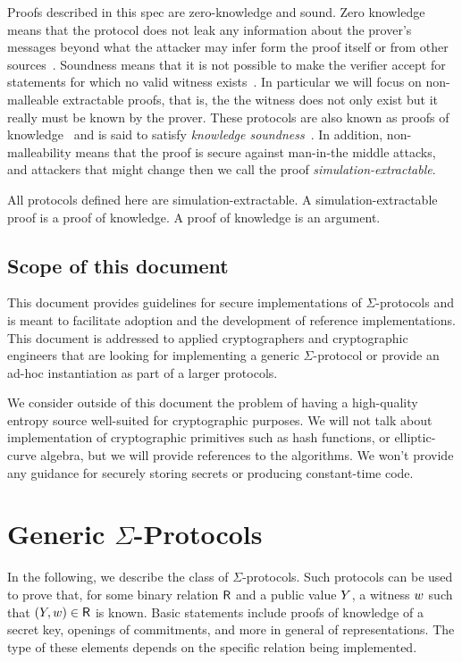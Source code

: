\documentclass[11pt]{article}
\begin{document}
Proofs described in this spec are zero-knowledge and sound.
Zero knowledge means that the protocol does not leak any information about the prover's messages beyond what the attacker may infer form the proof itself or from other sources~\cite[1.6.4]{zkproof-reference}.
Soundness means that it is not possible to make the verifier accept for statements for which no valid witness exists~\cite[1.6.2]{zkproof-reference}.
In particular we will focus on non-malleable extractable proofs, that is, the the witness does not only exist but it really must be known by the prover.
These protocols are also known as proofs of knowledge~\cite{STOC:GolMicRac85,STOC:FeiFiaSha87,C:BelGol92} and is said to satisfy \emph{knowledge soundness}~\cite{damgard04}. In addition, non-malleability means that the proof is secure against man-in-the middle attacks, and attackers that might change  then we call the proof \emph{simulation-extractable}.

All protocols defined here are simulation-extractable. A simulation-extractable proof is a proof of knowledge. A proof of knowledge is an argument.

\subsection{Scope of this document}

This document provides guidelines for secure implementations of $\Sigma$-protocols and is meant to facilitate adoption and the development of reference implementations.
This document is addressed to applied cryptographers and cryptographic engineers that are looking for implementing a generic
$\Sigma$-protocol or provide an ad-hoc instantiation as part of a larger protocols.

We consider outside of this document the problem of having a high-quality
entropy source well-suited for crypto\-graphic purposes.
We will not talk about implementation of cryptographic primitives such as hash functions, or elliptic-curve algebra, but we will provide references to the algorithms.
We won't provide any guidance for securely storing secrets or producing constant-time code.

\section{Generic $\Sigma$-Protocols}
In the following, we describe the class of $\Sigma$-protocols.
Such protocols can be used to prove that, for some binary relation $\mathsf{R}$ and a public value $Y$, a witness $w$ such that $(Y,w)\in\mathsf{R}$ is known.
Basic statements include proofs of knowledge of a secret key, openings of commitments, and more in general of representations.
The type of these elements depends on the specific relation being implemented.
\end{document}
